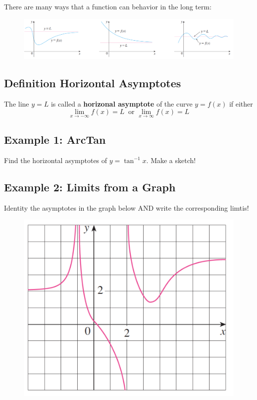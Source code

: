 \documentclass[10pt]{book}
\theoremstyle{definition}
\begin{document}
There are many ways that a function can behavior in the long term:
\begin{figure}[h!]
    \centering
    \includegraphics[scale=0.75]{fig2.png}
\end{figure}
\raggedbottom
\clearpage
\begin{tcolorbox}
\subsection*{Definition Horizontal Asymptotes}
The line $y=L$ is called a \textbf{horizonal asymptote} of the curve $y=f(x)$ if either
\[
\lim_{x\rightarrow -\infty}f(x)=L\ \text{ or } \lim_{x\rightarrow \infty}f(x)=L
\]
\end{tcolorbox}
\subsection*{Example 1: ArcTan}
Find the horizontal asymptotes of $y=\tan^{-1}x$. Make a sketch!\vspace{4cm}
\subsection*{Example 2: Limits from a Graph}
Identity the asymptotes in the graph below AND write the corresponding limtis!
\begin{figure}[h!]
    \centering
    \includegraphics[scale=0.55]{fig3.png}
\end{figure}
\clearpage
\end{document}
